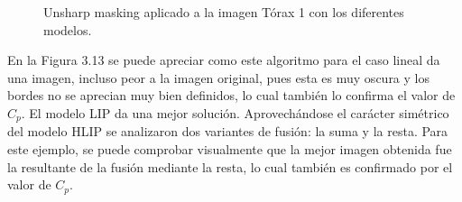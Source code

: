 \begin{figure}
\begin{center}
		\caption{Unsharp masking aplicado a la imagen T\'orax 1 con los diferentes modelos.}
	\end{center}
\end{figure}

En la Figura 3.13 se puede apreciar como este algoritmo para el caso lineal da una imagen, incluso peor a la imagen original, pues esta es muy oscura y los bordes no se aprecian muy bien definidos, lo cual tambi\'en lo confirma el valor de $C_p$. El modelo LIP da una mejor soluci\'on. Aprovech\'andose el car\'acter sim\'etrico del modelo HLIP se analizaron dos variantes de fusi\'on: la suma y la resta. Para este ejemplo, se puede comprobar visualmente que la mejor imagen obtenida fue la resultante de la fusi\'on mediante la resta, lo cual tambi\'en es confirmado por el valor de $C_p$. 

